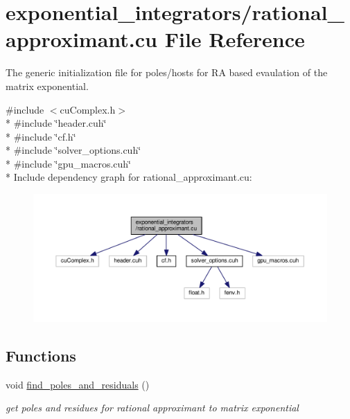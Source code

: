 \hypertarget{rational__approximant_8cu}{}\section{exponential\+\_\+integrators/rational\+\_\+approximant.cu File Reference}
\label{rational__approximant_8cu}


The generic initialization file for poles/hosts for RA based evaulation of the matrix exponential.  


{\ttfamily \#include $<$cu\+Complex.\+h$>$}\\*
{\ttfamily \#include \char`\"{}header.\+cuh\char`\"{}}\\*
{\ttfamily \#include \char`\"{}cf.\+h\char`\"{}}\\*
{\ttfamily \#include \char`\"{}solver\+\_\+options.\+cuh\char`\"{}}\\*
{\ttfamily \#include \char`\"{}gpu\+\_\+macros.\+cuh\char`\"{}}\\*
Include dependency graph for rational\+\_\+approximant.\+cu\+:\nopagebreak
\begin{figure}[H]
\begin{center}
\leavevmode
\includegraphics[width=350pt]{rational__approximant_8cu__incl}
\end{center}
\end{figure}
\subsection*{Functions}
\begin{DoxyCompactItemize}
\item 
void \hyperlink{rational__approximant_8cu_a1cb9bed79a1ce457c891851da0cec0ba}{find\+\_\+poles\+\_\+and\+\_\+residuals} ()
\begin{DoxyCompactList}\small\item\em get poles and residues for rational approximant to matrix exponential \end{DoxyCompactList}\end{DoxyCompactItemize}
